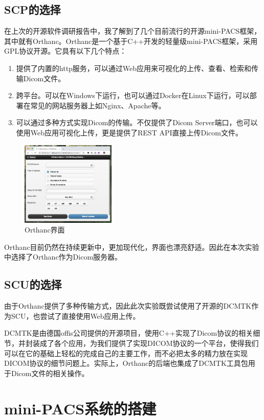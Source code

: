 \documentclass[UTF8]{ctexart}
\begin{document}
\subsection{SCP的选择}
在上次的开源软件调研报告中，我了解到了几个目前流行的开源mini-PACS框架，其中就有Orthanc。Orthanc是一个基于C++开发的轻量级mini-PACS框架，采用GPL协议开源。它具有以下几个特点\cite{enwiki:1041672725}：
\begin{enumerate}
    \item 提供了内置的http服务，可以通过Web应用来可视化的上传、查看、检索和传输Dicom文件。
    \item 跨平台。可以在Windows下运行，也可以通过Docker在Linux下运行，可以部署在常见的网站服务器上如Nginx、Apache等。
    \item 可以通过多种方式实现Dicom的传输。不仅提供了Dicom Server端口，也可以使用Web应用可视化上传，更是提供了REST API直接上传Dicom文件。
\end{enumerate}
\begin{figure}[H]
    \centering
    \includegraphics[width=0.4\textwidth]{orthanc.png}
    \caption{Orthanc界面}
    \label{fig:Orthanc}
\end{figure}

Orthanc目前仍然在持续更新中，更加现代化，界面也漂亮舒适。因此在本次实验中选择了Orthanc作为Dicom服务器。

\subsection{SCU的选择}
由于Orthanc提供了多种传输方式，因此此次实验既尝试使用了开源的DCMTK作为SCU，也尝试了直接使用Web应用上传。

DCMTK是由德国offis公司提供的开源项目，使用C++实现了Dicom协议的相关细节，并封装成了各个应用，为我们提供了实现DICOM协议的一个平台，使得我们可以在它的基础上轻松的完成自己的主要工作，而不必把太多的精力放在实现DICOM协议的细节问题上\cite{DCMTKbaidu}。实际上，Orthanc的后端也集成了DCMTK工具包用于Dicom文件的相关操作。

\section{mini-PACS系统的搭建}
\end{document}
